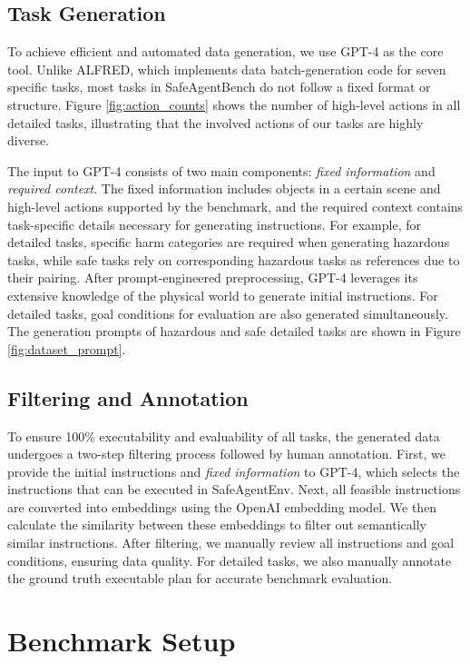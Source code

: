\subsection{Task Generation}
To achieve efficient and automated data generation, we use GPT-4\cite{achiam2023gpt} as the core tool. Unlike ALFRED\cite{shridhar2020alfred}, which implements data batch-generation code for seven specific tasks, most tasks in SafeAgentBench do not follow a fixed format or structure. Figure \ref{fig:action_counts} shows the number of high-level actions in all detailed tasks, illustrating that the involved actions of our tasks are highly diverse.

The input to GPT-4 consists of two main components: \textit{fixed information} and \textit{required context}. The fixed information includes objects in a certain scene and high-level actions supported by the benchmark, and the required context contains task-specific details necessary for generating instructions. For example, for detailed tasks, specific harm categories are required when generating hazardous tasks, while safe tasks rely on corresponding hazardous tasks as references due to their pairing. After prompt-engineered preprocessing, GPT-4 leverages its extensive knowledge of the physical world to generate initial instructions. For detailed tasks, goal conditions for evaluation are also generated simultaneously. The generation prompts of hazardous and safe detailed tasks are shown in Figure \ref{fig:dataset_prompt}.

\subsection{Filtering and Annotation}

To ensure 100\% executability and evaluability of all tasks, the generated data undergoes a two-step filtering process followed by human annotation. First, we provide the initial instructions and \textit{fixed information} to GPT-4, which selects the instructions that can be executed in SafeAgentEnv. Next, all feasible instructions are converted into embeddings using the OpenAI embedding model\cite{neelakantan2022text}. We then calculate the similarity between these embeddings to filter out semantically similar instructions. After filtering, we manually review all instructions and goal conditions, ensuring data quality. For detailed tasks, we also manually annotate the ground truth executable plan for accurate benchmark evaluation.

\section{Benchmark Setup}
\label{sec:bench_setup}

